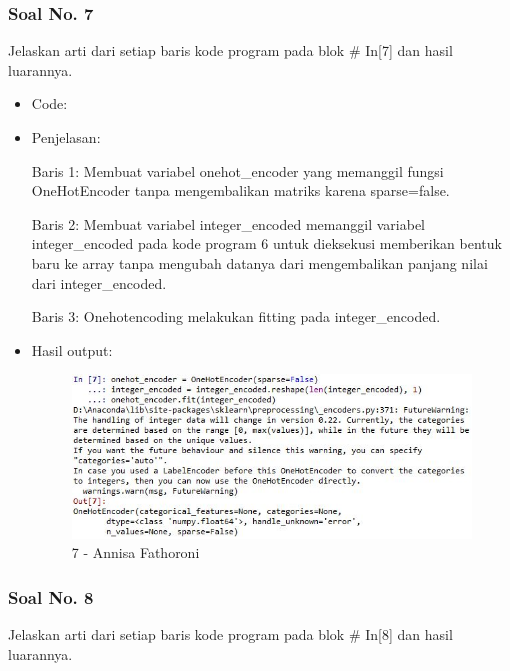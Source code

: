 \subsubsection{Soal No. 7}
Jelaskan arti dari setiap baris kode program pada blok \# In[7] dan hasil luarannya.

\begin{itemize}
\item Code:


\item Penjelasan:

Baris 1: Membuat variabel onehot\_encoder yang memanggil fungsi OneHotEncoder tanpa mengembalikan matriks karena sparse=false.

Baris 2: Membuat variabel integer\_encoded memanggil variabel integer\_encoded pada kode program 6 untuk dieksekusi memberikan bentuk baru ke array tanpa mengubah datanya dari mengembalikan panjang nilai dari integer\_encoded.

Baris 3: Onehotencoding melakukan fitting pada integer\_encoded.

\item Hasil output:

\begin{figure}[!hbtp]
\centering
\includegraphics[scale=0.7]{figures/Chapter 7/1164067/Praktek/Chapter7AnnisaFathoroni7.jpg}
\caption{7 - Annisa Fathoroni}
\label{7 - Annisa Fathoroni}
\end{figure}

\end{itemize}

\subsubsection{Soal No. 8}
Jelaskan arti dari setiap baris kode program pada blok \# In[8] dan hasil luarannya.

